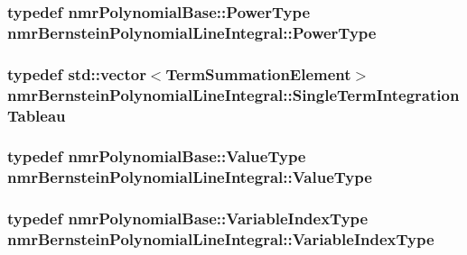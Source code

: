 \subsubsection[{Power\+Type}]{\setlength{\rightskip}{0pt plus 5cm}typedef {\bf nmr\+Polynomial\+Base\+::\+Power\+Type} {\bf nmr\+Bernstein\+Polynomial\+Line\+Integral\+::\+Power\+Type}}\label{classnmr_bernstein_polynomial_line_integral_a0e07aee2cb7c5f3f5d2c1f95cd4e9abf}
\hypertarget{classnmr_bernstein_polynomial_line_integral_a1d31908eb8195d1c00427f12dee7fe6b}{}
\subsubsection[{Single\+Term\+Integration\+Tableau}]{\setlength{\rightskip}{0pt plus 5cm}typedef std\+::vector$<${\bf Term\+Summation\+Element}$>$ {\bf nmr\+Bernstein\+Polynomial\+Line\+Integral\+::\+Single\+Term\+Integration\+Tableau}\hspace{0.3cm}{\ttfamily [protected]}}\label{classnmr_bernstein_polynomial_line_integral_a1d31908eb8195d1c00427f12dee7fe6b}
\hypertarget{classnmr_bernstein_polynomial_line_integral_ab1d3f80540e0791f359e53b3ef074a86}{}
\subsubsection[{Value\+Type}]{\setlength{\rightskip}{0pt plus 5cm}typedef {\bf nmr\+Polynomial\+Base\+::\+Value\+Type} {\bf nmr\+Bernstein\+Polynomial\+Line\+Integral\+::\+Value\+Type}}\label{classnmr_bernstein_polynomial_line_integral_ab1d3f80540e0791f359e53b3ef074a86}
\hypertarget{classnmr_bernstein_polynomial_line_integral_a125fa9ed7f5718e92272974aee68b27a}{}
\subsubsection[{Variable\+Index\+Type}]{\setlength{\rightskip}{0pt plus 5cm}typedef {\bf nmr\+Polynomial\+Base\+::\+Variable\+Index\+Type} {\bf nmr\+Bernstein\+Polynomial\+Line\+Integral\+::\+Variable\+Index\+Type}}\label{classnmr_bernstein_polynomial_line_integral_a125fa9ed7f5718e92272974aee68b27a}
\hypertarget{classnmr_bernstein_polynomial_line_integral_a229f7cb4c93c33c1b2a3de23d4f3460b}{}
